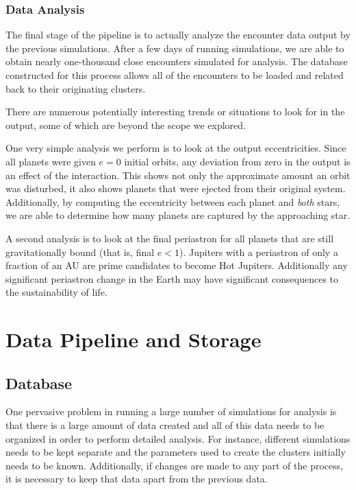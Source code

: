 \documentclass[12pt]{article}
\begin{document}
    \subsubsection{Data Analysis}

    The final stage of the pipeline is to actually analyze the encounter data 
    output by the previous simulations. After a few days of running simulations,
    we are able to obtain nearly one-thousand %
    close encounters simulated
    for analysis. The database constructed for this process allows all of the
    encounters to be loaded and related back to their originating clusters.

    There are numerous potentially interesting trends or situations to look for in
    the output, some of which are beyond the scope we explored. 
    
    One very simple analysis we perform is to look at the output
    eccentricities. Since all planets were given $e=0$ initial orbits, any deviation
    from zero in the output is an effect of the interaction. This shows not only the
    approximate amount an orbit was disturbed, it also shows planets that were ejected
    from their original system. Additionally, by computing the eccentricity between
    each planet and \textit{both} stars, we are able to determine how many planets are captured
    by the approaching star.

    A second analysis is to look at the final periastron for all planets that are still
    gravitationally bound (that is, final $e<1$). Jupiters with a periastron
    of only a fraction of an AU are prime candidates to become Hot Jupiters. Additionally
    any significant periastron change in the Earth may have significant consequences
    to the sustainability of life.

\section{Data Pipeline and Storage}

    \subsection{Database}

    One pervasive problem in running a large number of simulations for analysis is
    that there is a large amount of data created and all of this data needs to be
    organized in order to perform detailed analysis. For instance, different simulations
    needs to be kept separate and the parameters used to create the clusters initially
    needs to be known. Additionally, if changes are made to any part of the process, it
    is necessary to keep that data apart from the previous data.
\end{document}
